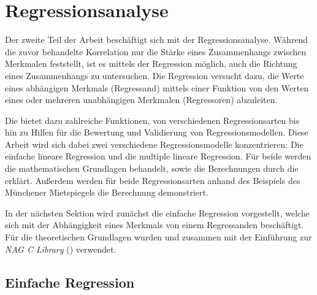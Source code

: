 \section{Regressionsanalyse}

Der zweite Teil der Arbeit beschäftigt sich mit der Regressionsanalyse.
Während die zuvor behandelte Korrelation nur die Stärke eines Zusammenhangs zwischen Merkmalen feststellt, ist es mittels der Regression möglich, auch die Richtung eines Zusammenhangs zu untersuchen.
Die Regression versucht dazu, die Werte eines abhängigen Merkmals (Regressand) mittels einer Funktion von den Werten eines oder mehreren unabhängigen Merkmalen (Regressoren) abzuleiten.

Die \naglib bietet dazu zahlreiche Funktionen, von verschiedenen Regressionsarten bis hin zu Hilfen für die Bewertung und Validierung von Regressionsmodellen.
Diese Arbeit wird sich dabei zwei verschiedene Regressionsmodelle konzentrieren:
Die einfache lineare Regression und die multiple lineare Regression.
Für beide werden die mathematischen Grundlagen behandelt, sowie die Berechnungen durch die \naglib erklärt. 
Außerdem werden für beide Regressionsarten anhand des Beispiels des Münchener Mietspiegels die Berechnung demonstriert.

In der nächsten Sektion wird zunächst die einfache Regression vorgestellt, welche sich mit der Abhängigkeit eines Merkmals von einem Regressanden beschäftigt.
Für die theoretischen Grundlagen wurden \cite{Cramer2007} und \cite{Fahrmeir2010} zusammen mit der Einführung zur {\it NAG C Library} (\cite{nag:intro}) verwendet.

\subsection{Einfache Regression}

